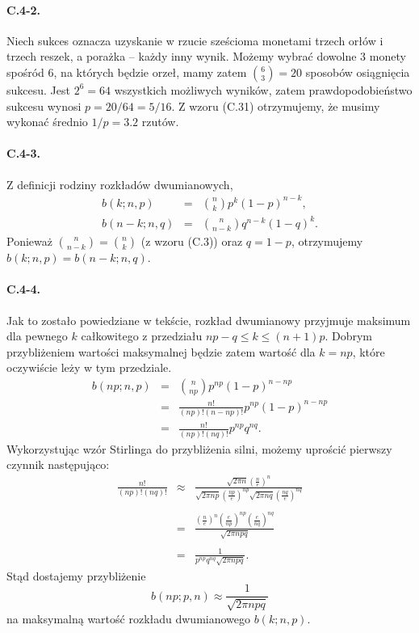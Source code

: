 \paragraph{C.4-2.}
Niech sukces oznacza uzyskanie w rzucie sześcioma monetami trzech orłów i trzech reszek, a porażka -- każdy inny wynik. Możemy wybrać dowolne $3$ monety spośród $6$, na których będzie orzeł, mamy zatem $\binom{6}{3}=20$ sposobów osiągnięcia sukcesu. Jest $2^6=64$ wszystkich możliwych wyników, zatem prawdopodobieństwo sukcesu wynosi $p=20/64=5/16$. Z wzoru (C.31) otrzymujemy, że musimy wykonać średnio $1/p=3.2$ rzutów.

\paragraph{C.4-3.}
Z definicji rodziny rozkładów dwumianowych,
\begin{eqnarray*}
	b(k;n,p) &=& \binom{n}{k}p^k(1-p)^{n-k}, \\
	b(n-k;n,q) &=& \binom{n}{n-k}q^{n-k}(1-q)^k.
\end{eqnarray*}
Ponieważ $\binom{n}{n-k} = \binom{n}{k}$ (z wzoru (C.3)) oraz $q=1-p$, otrzymujemy $b(k;n,p) = b(n-k;n,q)$.

\paragraph{C.4-4.}
Jak to zostało powiedziane w tekście, rozkład dwumianowy przyjmuje maksimum dla pewnego $k$ całkowitego z przedziału $np-q\le k\le (n+1)p$. Dobrym przybliżeniem wartości maksymalnej będzie zatem wartość dla $k=np$, które oczywiście leży w tym przedziale.
\begin{eqnarray*}
	b(np;n,p) &=& \binom{n}{np}p^{np}(1-p)^{n-np} \\
	&=& \frac{n!}{(np)!(n-np)!}p^{np}(1-p)^{n-np} \\
	&=& \frac{n!}{(np)!(nq)!}p^{np}q^{nq}.
\end{eqnarray*}
Wykorzystując wzór Stirlinga do przybliżenia silni, możemy uprościć pierwszy czynnik następująco:
\begin{eqnarray*}
	\frac{n!}{(np)!(nq)!} &\approx& \frac{\sqrt{2\pi n}\left(\frac{n}{e}\right)^n}{\sqrt{2\pi np}\left(\frac{np}{e}\right)^{np}\sqrt{2\pi nq}\left(\frac{nq}{e}\right)^{nq}} \\\\
	&=& \frac{\left(\frac{n}{e}\right)^n\left(\frac{e}{np}\right)^{np}\left(\frac{e}{nq}\right)^{nq}}{\sqrt{2\pi npq}} \\\\
	&=& \frac{1}{p^{np}q^{nq}\sqrt{2\pi npq}}.
\end{eqnarray*}
Stąd dostajemy przybliżenie
\[
	b(np;p,n)\approx\frac{1}{\sqrt{2\pi npq}}
\]
na maksymalną wartość rozkładu dwumianowego $b(k;n,p)$.

